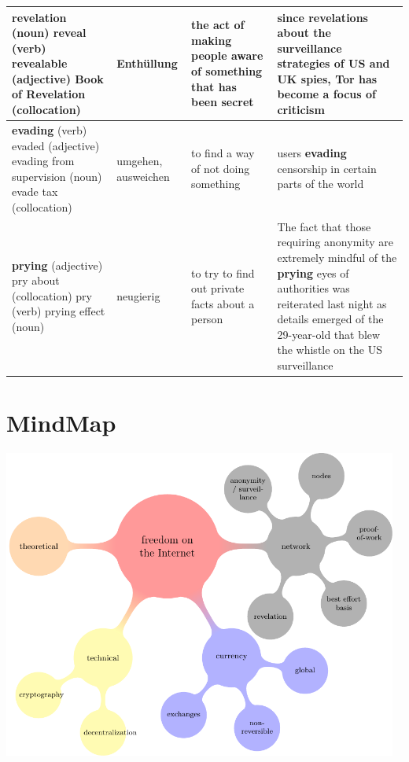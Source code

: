 \documentclass[english, DIV=calc, BCOR=5mm, fontsize=11pt, portrait]{scrartcl}	 %
\begin{document}
\begin{longtable}{p{3cm}||p{3cm}|p{3cm}|p{4cm}}
\hline
\textbf{revelation} (noun) \newline reveal (verb) \newline revealable (adjective) \newline Book of Revelation (collocation) & Enthüllung & the act of making people aware of something that has been secret & since \textbf{revelation}s about the surveillance strategies of US and UK spies, Tor has become a focus of criticism \\
\hline
\textbf{evading} (verb) \newline evaded (adjective) \newline evading from supervision (noun) \newline evade tax (collocation) & umgehen, ausweichen & to find a way of not doing something & users \textbf{evading} censorship in certain parts of the world \\
\hline
\textbf{prying} (adjective) \newline pry about (collocation) \newline pry (verb) \newline prying effect (noun) & neugierig & to try to find out private facts about a person & The fact that those requiring anonymity are extremely mindful of the \textbf{prying} eyes of authorities was reiterated last night as details emerged of the 29-year-old that blew the whistle on the US surveillance \\
\end{longtable}

\section{MindMap}

\includegraphics[width=13cm]{./img/MindMap.pdf}
\end{document}

